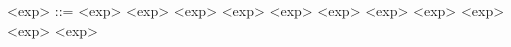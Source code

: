 \begin{grammarEx}
	<exp> ::= <exp> \lit{+} <exp>
	\alt <exp> \lit{-} <exp>
	\alt <exp> \lit{*} <exp>
	\alt <exp> \lit{/} <exp>
	\alt <exp> \lit{\^} <exp>
	\alt <exp> \lit{!}
	\alt {}
	\alt {}
\end{grammarEx}